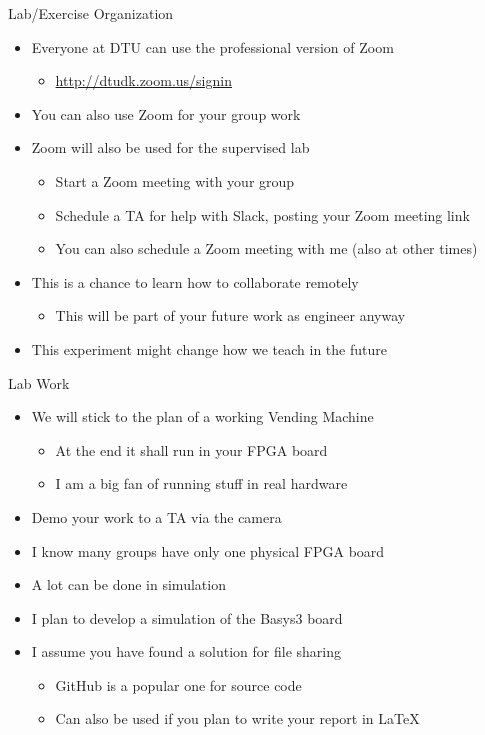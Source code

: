 \begin{frame}[fragile]{Lab/Exercise Organization}
\begin{itemize}
\item Everyone at DTU can use the professional version of Zoom
\begin{itemize}
\item \url{http://dtudk.zoom.us/signin}
\end{itemize}
\item You can also use Zoom for your group work
\item Zoom will also be used for the supervised lab
\begin{itemize}
\item Start a Zoom meeting with your group
\item Schedule a TA for help with Slack, posting your Zoom meeting link
\item You can also schedule a Zoom meeting with me (also at other times)
\end{itemize}
\item This is a chance to learn how to collaborate remotely
\begin{itemize}
\item This will be part of your future work as engineer anyway
\end{itemize}
\item This experiment might change how we teach in the future
\end{itemize}
\end{frame}

\begin{frame}[fragile]{Lab Work}
\begin{itemize}
\item We will stick to the plan of a working Vending Machine
\begin{itemize}
\item At the end it shall run in your FPGA board
\item I am a big fan of running stuff in real hardware
\end{itemize}
\item Demo your work to a TA via the camera
\item I know many groups have only one physical FPGA board
\item A lot can be done in simulation
\item I plan to develop a simulation of the Basys3 board
\item I assume you have found a solution for file sharing
\begin{itemize}
\item GitHub is a popular one for source code
\item Can also be used if you plan to write your report in LaTeX
\end{itemize}
\end{itemize}
\end{frame}

